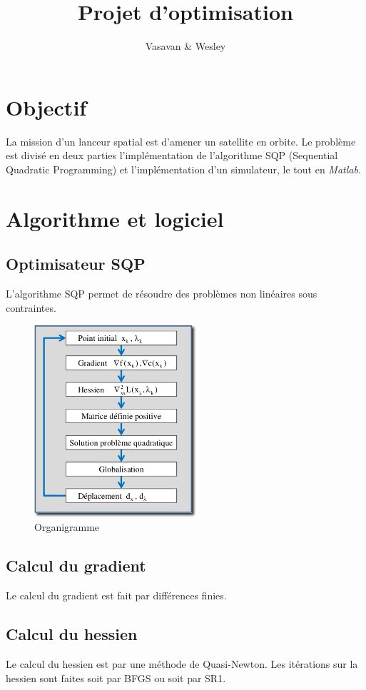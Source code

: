 \documentclass[a4paper]{article}
\title{Projet d'optimisation}
\author{Vasavan \& Wesley}
\begin{document}
\maketitle
\newpage
\protect\hypertarget{table}{}
\renewcommand{\contentsname}{Sommaire}
\tableofcontents
\newpage
\newpage

\section{Objectif}
La mission d'un lanceur spatial est d'amener un satellite en orbite. Le
 probl\`eme est divis\'e en deux parties l'impl\'ementation de l'algorithme SQP
 (Sequential Quadratic Programming) et l'impl\'ementation d'un simulateur, le
 tout en \textit{Matlab}.
\newpage

\section{Algorithme et logiciel}
\subsection{Optimisateur SQP}
L'algorithme SQP permet de r\'esoudre des probl\`emes non lin\'eaires sous
 contraintes.

\begin{figure}[h!]
\centering
\includegraphics[width=6cm]{capture.png}
\caption{Organigramme}
\label{fig:1}
\end{figure}

\subsection{Calcul du gradient}
Le calcul du gradient est fait par diff\'erences finies.
\subsection{Calcul du hessien}
Le calcul du hessien est par une m\'ethode de Quasi-Newton. Les it\'erations
 sur la hessien sont faites soit par BFGS ou soit par SR1.
\end{document}
